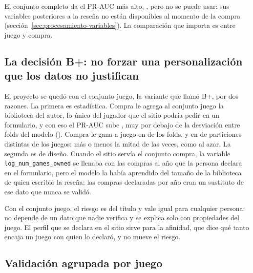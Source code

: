 \begin{table}[htbp]
  \centering\small
  
  \caption{PR-AUC del mismo modelo con cada conjunto de variables: media y desviación estándar de
  los \cifraPliegues{} folds de la partición congelada, y cuántas veces la media supera a la del
  trivial. Fuente: \texttt{evaluar\_gkf} de \texttt{backend/modelado/entrenar\_baseline.py} sobre
  data-v1.}
  \label{tab:conjuntos}
\end{table}

El conjunto completo da el PR-AUC más alto, \cifraPRAUCCompleto{}, pero no se puede usar: sus
variables posteriores a la reseña no están disponibles al momento de la compra
(sección~\ref{sec:procesamiento-variables}). La comparación que importa es entre juego y compra.

\subsection{La decisión B+: no forzar una personalización que los datos no justifican}\label{sec:modelacion-bmas}

El proyecto se quedó con el conjunto juego, la variante que llamó B+, por dos razones. La primera
es estadística. Compra le agrega al conjunto juego la biblioteca del autor, lo único del jugador
que el sitio podría pedir en un formulario, y con eso el PR-AUC sube \cifraDiferenciaCompraJuego{},
muy por debajo de la desviación entre folds del modelo (\cifraPRAUCModeloStd{}). Compra le gana a
juego en \cifraFoldsCompraGana{} de los \cifraPliegues{} folds, y en \cifraParticionesCompraGana{}
de \cifraParticionesSimuladas{} particiones distintas de los juegos: más o menos la mitad de las
veces, como al azar. La segunda es de diseño. Cuando el sitio servía el conjunto compra, la
variable \texttt{log\_num\_games\_owned} se llenaba con las compras al año que la persona declara
en el formulario, pero el modelo la había aprendido del tamaño de la biblioteca de quien escribió
la reseña; las compras declaradas por año eran un sustituto de ese dato que nunca se validó.

Con el conjunto juego, el riesgo es del título y vale igual para cualquier persona: no depende de
un dato que nadie verifica y se explica solo con propiedades del juego. El perfil que se declara
en el sitio sirve para la afinidad, que dice qué tanto encaja un juego con quien lo declaró, y no
mueve el riesgo.

\subsection{Validación agrupada por juego}\label{sec:modelacion-validacion}

